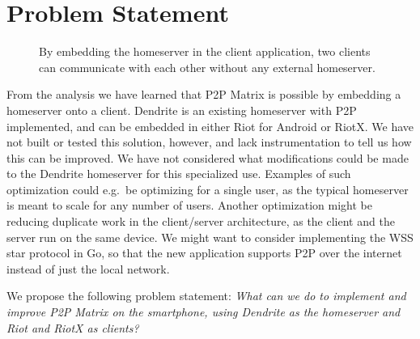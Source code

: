 \section{Problem Statement}
\begin{figure}
      \centering
      \resizebox{0.8\linewidth}{!}{}
      \caption{
            By embedding the homeserver in the client application, two clients can communicate with each other without any external homeserver.
      }
      \label{fig:p2p-embed}
\end{figure}
From the analysis we have learned that \ac{P2P} Matrix is possible by embedding a homeserver onto a client.
Dendrite is an existing homeserver with \ac{P2P} implemented, and can be embedded in either Riot for Android or RiotX.
We have not built or tested this solution, however, and lack instrumentation to tell us how this can be improved.
We have not considered what modifications could be made to the Dendrite homeserver for this specialized use.
Examples of such optimization could e.g.~be optimizing for a single user, as the typical homeserver is meant to scale for any number of users.
Another optimization might be reducing duplicate work in the client/server architecture, as the client and the server run on the same device.
We might want to consider implementing the WSS star protocol in Go, so that the new application supports \ac{P2P} over the internet instead of just the local network.

\begin{center}
      We propose the following problem statement:
      \textit{What can we do to implement and improve \ac{P2P} Matrix on the smartphone, using Dendrite as the homeserver and Riot and RiotX as clients?}
\end{center}